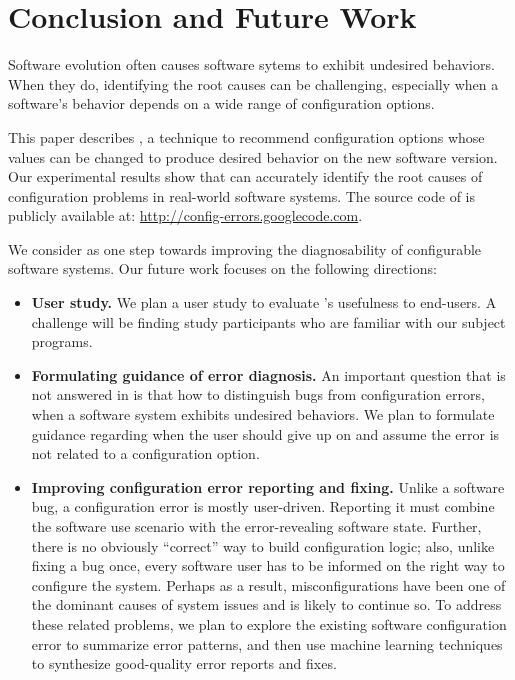 \section{Conclusion and Future Work}
\label{sec:conclusion}

Software evolution often causes software sytems to
exhibit undesired behaviors.
When they do, identifying the root causes
can be challenging, especially when a software's
behavior depends on a wide range of configuration options.

This paper describes \ourtool, a technique to recommend
configuration options whose values can be changed to
produce desired behavior on the new software version.
Our experimental results show that \ourtool
can accurately identify the root causes of
\errornum configuration problems in \subjnum real-world software systems.
The source code of \ourtool is publicly available
at: \url{http://config-errors.googlecode.com}.

We consider \ourtool as one step towards improving
the diagnosability of configurable software systems.
Our future work focuses on the following directions:

\vspace{-2mm}

\begin{itemize}
\item \textbf{User study.} We plan a user study to evaluate
\ourtool's usefulness to end-users. A challenge
will be finding study participants who are familiar
with our subject programs.

\item \textbf{Formulating guidance of error diagnosis.}
An important question that is not answered in \ourtool
is that how to distinguish bugs from 
configuration errors, when a software system exhibits
undesired behaviors. We plan to formulate guidance
regarding when the user should give up on \ourtool
and assume the error is not related to a configuration option.

\item \textbf{Improving configuration error reporting and fixing.}
Unlike a software bug, a configuration error is mostly
user-driven. Reporting it must combine the software use
scenario with the error-revealing software state.
Further, there is no obviously ``correct'' way to
build configuration logic; also, unlike fixing a bug once,
every software user has to be informed on the right way to
configure the system.  Perhaps as a result, misconfigurations
have been one of the dominant causes of system issues and
is likely to continue so. To address these related problems,
we plan to explore the existing software configuration error
to summarize error patterns, and then use machine learning
techniques to synthesize good-quality error reports and fixes.



\end{itemize}

